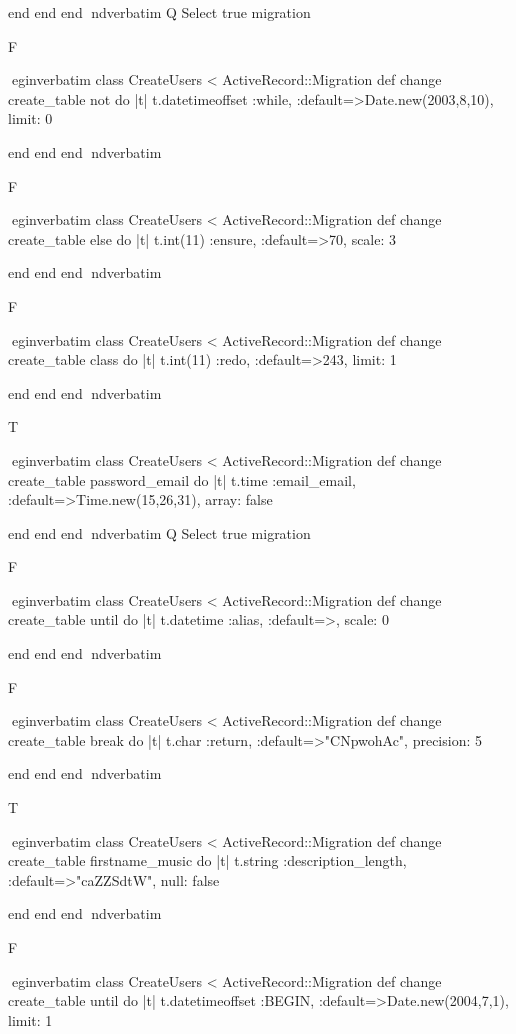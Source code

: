     end 
  end 
end
nd{verbatim}
Q
 Select true migration

F

egin{verbatim}
 class CreateUsers < ActiveRecord::Migration 
  def change 
    create_table not do |t| 
      t.datetimeoffset :while, :default=>Date.new(2003,8,10), limit: 0
    
    end 
  end 
end
nd{verbatim}

F

egin{verbatim}
 class CreateUsers < ActiveRecord::Migration 
  def change 
    create_table else do |t| 
      t.int(11) :ensure, :default=>70, scale: 3
    
    end 
  end 
end
nd{verbatim}

F

egin{verbatim}
 class CreateUsers < ActiveRecord::Migration 
  def change 
    create_table class do |t| 
      t.int(11) :redo, :default=>243, limit: 1
    
    end 
  end 
end
nd{verbatim}

T

egin{verbatim}
 class CreateUsers < ActiveRecord::Migration 
  def change 
    create_table password_email do |t| 
      t.time :email_email, :default=>Time.new(15,26,31), array: false
    
    end 
  end 
end
nd{verbatim}
Q
 Select true migration

F

egin{verbatim}
 class CreateUsers < ActiveRecord::Migration 
  def change 
    create_table until do |t| 
      t.datetime :alias, :default=>, scale: 0
    
    end 
  end 
end
nd{verbatim}

F

egin{verbatim}
 class CreateUsers < ActiveRecord::Migration 
  def change 
    create_table break do |t| 
      t.char :return, :default=>"CNpwohAc", precision: 5
    
    end 
  end 
end
nd{verbatim}

T

egin{verbatim}
 class CreateUsers < ActiveRecord::Migration 
  def change 
    create_table firstname_music do |t| 
      t.string :description_length, :default=>"caZZSdtW", null: false
    
    end 
  end 
end
nd{verbatim}

F

egin{verbatim}
 class CreateUsers < ActiveRecord::Migration 
  def change 
    create_table until do |t| 
      t.datetimeoffset :BEGIN, :default=>Date.new(2004,7,1), limit: 1
    
